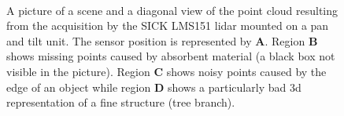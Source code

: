 \begin{figure}[htpb]
    \centering
    \\\vspace{1em}
    \caption{A picture of a scene \protect{} and a diagonal view of the point cloud \protect{} resulting from the acquisition by the SICK LMS151 \gls{lidar} mounted on a pan and tilt unit. The sensor position is represented by \textbf{A}. Region \textbf{B} shows missing points caused by absorbent material (a black box not visible in the picture). Region \textbf{C} shows noisy points caused by the edge of an object while region \textbf{D} shows a particularly bad \gls{3d} representation of a fine structure (tree branch).}
    \label{fig:shadow_points}
\end{figure}
